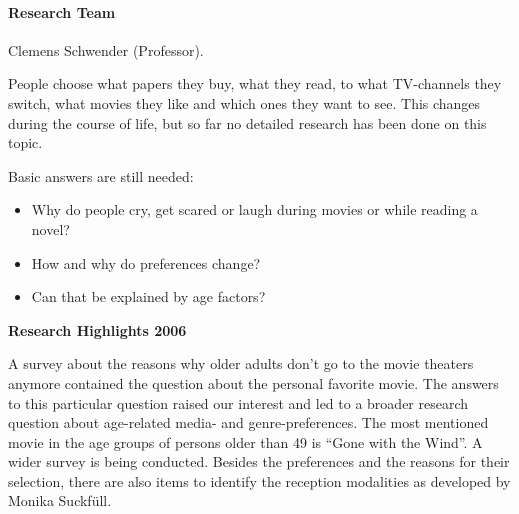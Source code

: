 
\paragraph{Research Team}
Clemens Schwender (Professor).

 People choose what papers they buy, what they read, to what TV-channels they switch, what movies they like and which ones they want to see. This changes during the course of life, but so far no detailed research has been done on this topic.

 Basic answers are still needed: 
\begin{itemize}
	\item Why do people cry, get scared or laugh during movies or while reading a novel?
	\item How and why do preferences change?
	\item Can that be explained by age factors?
\end{itemize}

\null
\textbf{Research Highlights 2006}

 A survey about the reasons why older adults don't go to the movie theaters anymore contained the question about the personal favorite movie. The answers to this particular question raised our interest and led to a broader research question about age-related media- and genre-preferences. The most mentioned movie in the age groups of persons older than 49 is ``Gone with the Wind''.  A wider survey is being conducted. Besides the preferences and the reasons for their selection, there are also items to identify the reception modalities as developed by Monika Suckf\"{u}ll.


